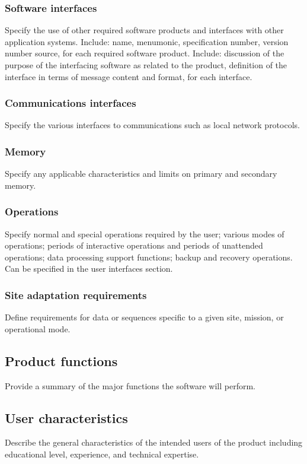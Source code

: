 \documentclass[letterpaper,10pt,draftclsnofoot,onecolumn,titlepage]{IEEEtran}
\begin{document}
	\subsubsection{Software interfaces}
	Specify the use of other required software products and interfaces with other application systems.
	Include: name, menumonic, specification number, version number source, for each required software product. 
	Include: discussion of the purpose of the interfacing software as related to the product, definition of the interface in terms of message content and format, for each interface.
	
	\subsubsection{Communications interfaces}
	Specify the various interfaces to communications such as local network protocols.
	
	\subsubsection{Memory}
	Specify any applicable characteristics and limits on primary and secondary memory.
	
	\subsubsection{Operations}
	Specify normal and special operations required by the user; various modes of operations; periods of interactive operations and periods of unattended operations; data processing support functions; backup and recovery operations.
	Can be specified in the user interfaces section. 
	
	\subsubsection{Site adaptation requirements}
	Define requirements for data or sequences specific to a given site, mission, or operational mode.
		
	\subsection{Product functions}
	Provide a summary of the major functions the software will perform.
	
	\subsection{User characteristics}
	Describe the general characteristics of the intended users of the product including educational level, experience, and technical expertise. 
	
\end{document}
